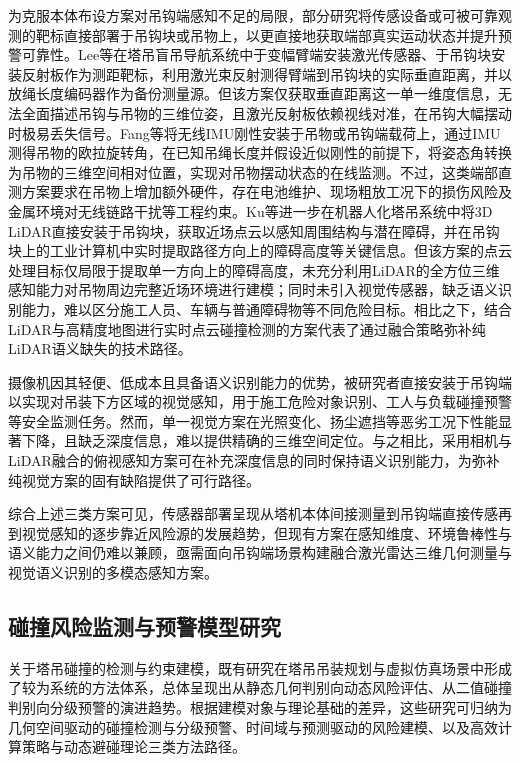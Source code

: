 为克服本体布设方案对吊钩端感知不足的局限，部分研究将传感设备或可被可靠观测的靶标直接部署于吊钩块或吊物上，以更直接地获取端部真实运动状态并提升预警可靠性。Lee等\cite{J95BVZBC}在塔吊盲吊导航系统中于变幅臂端安装激光传感器、于吊钩块安装反射板作为测距靶标，利用激光束反射测得臂端到吊钩块的实际垂直距离，并以放绳长度编码器作为备份测量源。但该方案仅获取垂直距离这一单一维度信息，无法全面描述吊钩与吊物的三维位姿，且激光反射板依赖视线对准，在吊钩大幅摆动时极易丢失信号。Fang等\cite{K9J9CXIH}将无线IMU刚性安装于吊物或吊钩端载荷上，通过IMU测得吊物的欧拉旋转角，在已知吊绳长度并假设近似刚性的前提下，将姿态角转换为吊物的三维空间相对位置，实现对吊物摆动状态的在线监测。不过，这类端部直测方案要求在吊物上增加额外硬件，存在电池维护、现场粗放工况下的损伤风险及金属环境对无线链路干扰等工程约束\cite{K9J9CXIH}。Ku等\cite{J95BVZBC}进一步在机器人化塔吊系统中将3D LiDAR直接安装于吊钩块，获取近场点云以感知周围结构与潜在障碍，并在吊钩块上的工业计算机中实时提取路径方向上的障碍高度等关键信息。但该方案的点云处理目标仅局限于提取单一方向上的障碍高度，未充分利用LiDAR的全方位三维感知能力对吊物周边完整近场环境进行建模；同时未引入视觉传感器，缺乏语义识别能力，难以区分施工人员、车辆与普通障碍物等不同危险目标\cite{J95BVZBC}。相比之下，结合LiDAR与高精度地图进行实时点云碰撞检测的方案\cite{7}代表了通过融合策略弥补纯LiDAR语义缺失的技术路径。

摄像机因其轻便、低成本且具备语义识别能力的优势，被研究者直接安装于吊钩端以实现对吊装下方区域的视觉感知，用于施工危险对象识别\cite{MHXEXK6X}、工人与负载碰撞预警\cite{G47UYPFK}等安全监测任务。然而，单一视觉方案在光照变化、扬尘遮挡等恶劣工况下性能显著下降，且缺乏深度信息，难以提供精确的三维空间定位。与之相比，采用相机与LiDAR融合的俯视感知方案可在补充深度信息的同时保持语义识别能力，为弥补纯视觉方案的固有缺陷提供了可行路径。

综合上述三类方案可见，传感器部署呈现从塔机本体间接测量到吊钩端直接传感再到视觉感知的逐步靠近风险源的发展趋势，但现有方案在感知维度、环境鲁棒性与语义能力之间仍难以兼顾\cite{5,7}，亟需面向吊钩端场景构建融合激光雷达三维几何测量与视觉语义识别的多模态感知方案。

\subsection{碰撞风险监测与预警模型研究}\label{ux78b0ux649eux68c0ux6d4bux7b97ux6cd5ux4e0eux9884ux8b66ux6a21ux578bux7814ux7a76}

关于塔吊碰撞的检测与约束建模，既有研究在塔吊吊装规划与虚拟仿真场景中形成了较为系统的方法体系\cite{NEKKIG45}，总体呈现出从静态几何判别向动态风险评估、从二值碰撞判别向分级预警的演进趋势。根据建模对象与理论基础的差异，这些研究可归纳为几何空间驱动的碰撞检测与分级预警、时间域与预测驱动的风险建模、以及高效计算策略与动态避碰理论三类方法路径。

